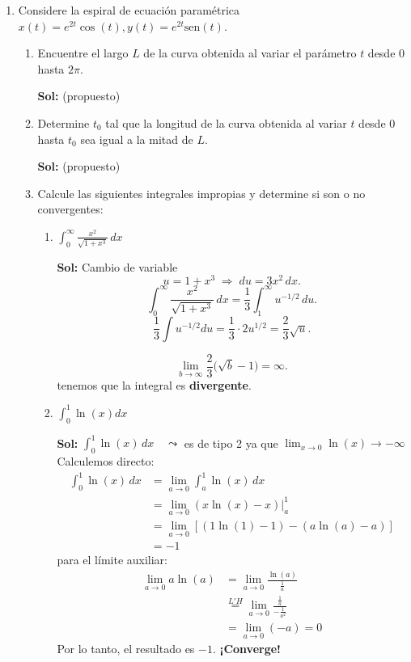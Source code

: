 \documentclass[letterpaper,12pt]{article}
\theoremstyle{plain}
\theoremstyle{definition}
\newcommand{\sen}{\text{sen}}
\begin{document}
\begin{enumerate}
\color{black}


\item Considere la espiral de ecuación paramétrica $x(t) = e^{2t} \cos(t), y(t) = e^{2t} \sen(t)$.
\begin{enumerate}
    \item  Encuentre el largo $L$ de la curva obtenida al variar el parámetro $t$ desde $0$ hasta $2\pi$.

\color{blue}
\textbf{Sol:} (propuesto)
\color{black}
    
    \item Determine $t_0$ tal que la longitud de la curva obtenida al variar $t$ desde $0$ hasta $t_0$ sea igual a la mitad de $L$.

\color{blue}
\textbf{Sol:} (propuesto)
\color{black}

\item Calcule las siguientes integrales impropias y determine si son o no convergentes:
    \begin{enumerate}
        \item $\displaystyle \int_0^{\infty} \frac{x^2}{\sqrt{1 + x^3}} \, dx$

\color{blue}
\textbf{Sol:} Cambio de variable
\[
u=1+x^3 \;\Rightarrow\; du=3x^2\,dx.
\]
\[
\int_0^{\infty}\frac{x^2}{\sqrt{1+x^3}}\,dx
=\frac{1}{3}\int_{1}^{\infty} u^{-1/2}\,du.
\]
\[
\frac{1}{3}\int u^{-1/2}du
=\frac{1}{3}\cdot 2u^{1/2}
=\frac{2}{3}\sqrt{u}.
\]

\[
\lim_{b\to\infty}\frac{2}{3}\big(\sqrt{b}-1\big)=\infty.
\]
tenemos que la integral es \textbf{divergente}.
\color{black}
        
        \item $\displaystyle \int_0^1 \ln(x)dx$

\color{blue}
\textbf{Sol:} $\displaystyle \int_{0}^{1} \ln(x) \, dx \quad \leadsto$ es de tipo 2 ya que $\displaystyle \lim_{x \to 0} \ln(x) \to -\infty$
Calculemos directo:
\begin{align*}
\int_{0}^{1} \ln(x) \, dx &= \lim_{a \to 0} \int_{a}^{1} \ln(x) \, dx \\
&= \lim_{a \to 0} (x \ln(x) - x) \bigg|_{a}^{1} \\
&= \lim_{a \to 0} \left[ (1 \ln(1) - 1) - (a \ln(a) - a) \right] \\
&= -1
\end{align*}
para el límite auxiliar:
\[
\begin{aligned}
\lim_{a \to 0} a \ln(a) &= \lim_{a \to 0} \frac{\ln(a)}{\frac{1}{a}} \\
&\stackrel{L'H}{=} \lim_{a \to 0} \frac{\frac{1}{a}}{-\frac{1}{a^2}} \\
&= \lim_{a \to 0} (-a) = 0
\end{aligned}
\]
Por lo tanto, el resultado es $-1$. \textbf{¡Converge!}
\color{black}
        

\end{enumerate}
\end{enumerate}
\end{enumerate}
\end{document}
